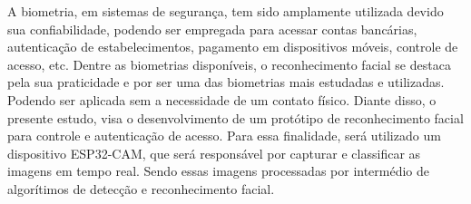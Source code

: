
\begin{resumoutfpr}%

A biometria, em sistemas de segurança, tem sido amplamente utilizada devido sua 
confiabilidade, podendo ser empregada para acessar contas bancárias, autenticação de 
estabelecimentos, pagamento em dispositivos móveis, controle de acesso, etc. 
Dentre as biometrias disponíveis, o reconhecimento facial se destaca pela sua 
praticidade e por ser uma das biometrias mais estudadas e utilizadas. 
Podendo ser aplicada sem a necessidade de um contato físico. Diante disso, 
o presente estudo, visa o desenvolvimento de um protótipo de 
reconhecimento facial para controle e autenticação de acesso. Para essa finalidade, 
será utilizado um dispositivo ESP32-CAM, que será responsável por capturar e 
classificar as imagens em tempo real. Sendo essas imagens processadas por intermédio 
de algorítimos de detecção e reconhecimento facial.
\end{resumoutfpr}
